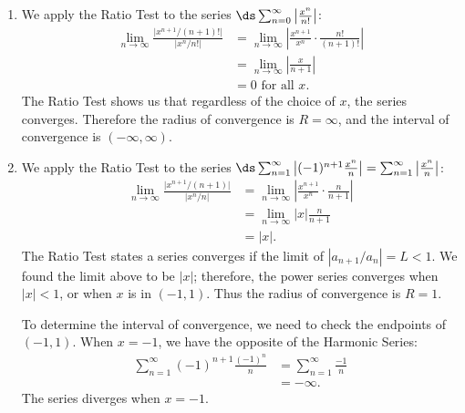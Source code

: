 {\begin{enumerate}
	\item We apply the Ratio Test to the series $\ds \sum_{n=0}^\infty \left|\frac{x^n}{n!}\right|$:
		\begin{align*}
		\lim_{n\to\infty} \frac{\big|x^{n+1}/(n+1)!\big|}{\big|x^n/n!\big|} &= \lim_{n\to\infty} \left|\frac{x^{n+1}}{x^n}\cdot\frac{n!}{(n+1)!}\right|\\
			&= \lim_{n\to\infty} \left|\frac x{n+1}\right|\\
			&= 0 \text{ for all } x.
		\end{align*}
		The Ratio Test shows us that regardless of the choice of $x$, the series converges. Therefore the radius of convergence is $R=\infty$, and the interval of convergence is $(-\infty,\infty)$.
		
	\item		We apply the Ratio Test to the series $\ds \sum_{n=1}^\infty \left|(-1)^{n+1}\frac{x^n}{n}\right| = \sum_{n=1}^\infty \left|\frac{x^n}{n}\right|$:
	\begin{align*}
	\lim_{n\to\infty} \frac{\big|x^{n+1}/(n+1)\big|}{\big|x^n/n\big|} &= \lim_{n\to\infty} \left|\frac{x^{n+1}}{x^n}\cdot \frac{n}{n+1}\right| \\
			&= \lim_{n\to\infty} |x|\frac{n}{n+1}\\
			&= |x|.
	\end{align*}
	The Ratio Test states a series converges if the limit of $|a_{n+1}/a_n| = L<1$. We found the limit above to be $|x|$; therefore, the power series converges when $|x| <1$, or when $x$ is in $(-1,1)$. Thus the radius of convergence is $R=1$.
	\drawexampleline
	
	To determine the interval of convergence, we need to check the endpoints of $(-1,1)$. When $x=-1$, we have the opposite of the Harmonic Series:
	\begin{align*}
	\sum_{n=1}^\infty (-1)^{n+1}\frac{(-1)^n}{n} &= \sum_{n=1}^\infty \frac{-1}{n}\\
				&= -\infty.
	\end{align*}
	The series diverges when $x=-1$.
	

\end{enumerate}}
